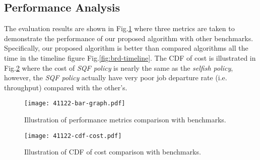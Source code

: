 \subsection{Performance Analysis}
\label{subsec:basic}
The evaluation results are shown in Fig.\ref{fig:bar_plot} where three metrics are taken to demonstrate the performance of our proposed algorithm with other benchmarks.
Specifically, our proposed algorithm is better than compared algorithms all the time in the timeline figure Fig.\ref{fig:brd-timeline}.
The CDF of cost is illustrated in Fig.\ref{fig:cdf_cost} where the cost of \emph{SQF policy} is nearly the same as the \emph{selfish policy}, however, the \emph{SQF policy} actually have very poor job departure rate (i.e. throughput) compared with the other's.

\begin{figure}[ht]                                                      %
    \centering                                                          %
    \texttt{[image: 41122-bar-graph.pdf]}         %
    \caption{Illustration of performance metrics comparison with benchmarks.}
    \label{fig:bar_plot}                                                %
\end{figure}                                                            %
\begin{figure}[ht]                                                      %
    \centering                                                          %
    \texttt{[image: 41122-cdf-cost.pdf]}          %
    \caption{Illustration of CDF of cost comparison with benchmarks.}
    \label{fig:cdf_cost}                                                %
\end{figure}                                                            %
